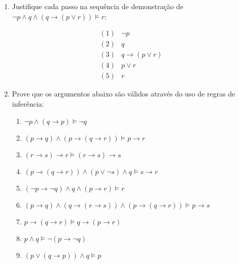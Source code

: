 \documentclass[12pt,a4paper,oneside]{article}
\begin{document}
\begin{enumerate}
	\item Justifique cada passo na sequência de demonstração de $\neg p \wedge q \wedge (q \rightarrow (p \vee r)) \models r$:
	
		\begin{eqnarray*}
			(1) &\neg p & \\
			(2) & q & \\
			(3) & q \rightarrow (p \vee r) & \\
			(4) & p \vee r & \\
			(5) & r &
		\end{eqnarray*}
		
	\item Prove que os argumentos abaixo são válidos através do uso de regras de inferência:
	
		\begin{enumerate}
			\item $\neg p \wedge (q \rightarrow p) \models \neg q$
			\item $(p \rightarrow q) \wedge (p \rightarrow (q \rightarrow r)) \models p \rightarrow r$
			\item $(r \rightarrow s) \rightarrow r \models (r \rightarrow s) \rightarrow s$
			\item $(p \rightarrow (q \rightarrow r)) \wedge (p \vee \neg s) \wedge q \models s \rightarrow r$
			\item $(\neg p \rightarrow \neg q) \wedge q \wedge (p \rightarrow r) \models r$
			\item $(p \rightarrow q) \wedge (q \rightarrow (r \rightarrow s)) \wedge (p \rightarrow (q \rightarrow r)) \models p \rightarrow s$
			\item $p \rightarrow (q \rightarrow r) \models q \rightarrow (p \rightarrow r)$
			\item $p \wedge q \models \neg (p \rightarrow \neg q)$
			\item $(p \vee (q \rightarrow p)) \wedge q \models p$
		\end{enumerate}
		
	
	
\end{enumerate}
\end{document}
